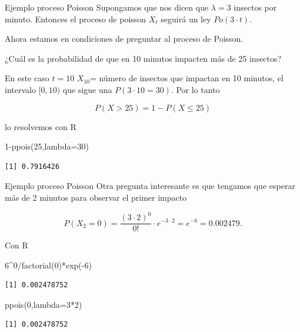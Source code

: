 \documentclass[
  ignorenonframetext,
  aspectratio=169]{beamer}
\newenvironment{Shaded}{\begin{snugshade}}{\end{snugshade}}
\newcommand{\AttributeTok}[1]{\textcolor[rgb]{0.40,0.45,0.13}{#1}}
\newcommand{\DecValTok}[1]{\textcolor[rgb]{0.68,0.00,0.00}{#1}}
\newcommand{\FunctionTok}[1]{\textcolor[rgb]{0.28,0.35,0.67}{#1}}
\newcommand{\NormalTok}[1]{\textcolor[rgb]{0.00,0.23,0.31}{#1}}
\newcommand{\SpecialCharTok}[1]{\textcolor[rgb]{0.37,0.37,0.37}{#1}}
\begin{document}
\begin{frame}[fragile]{Ejemplo proceso Poisson}
\protect\hypertarget{ejemplo-proceso-poisson-2}{}
Supongamos que nos dicen que \(\lambda=3\) insectos por minuto. Entonces
el proceso de poisson \(X_t\) seguirá un ley \(Po(3\cdot t).\)

Ahora estamos en condiciones de preguntar al proceso de Poisson.

¿Cuál es la probabilidad de que en 10 minutos impacten más de 25
insectos?

En este caso \(t=10\) \(X_{10}\)= número de insectos que impactan en 10
minutos, el intervalo \([0,10)\) que sigue una \(P(3\cdot 10=30)\). Por
lo tanto

\[P(X>25)=1-P(X\leq 25)\]

lo resolvemos con R

\begin{Shaded}
\begin{Highlighting}[]
\DecValTok{1}\SpecialCharTok{{-}}\FunctionTok{ppois}\NormalTok{(}\DecValTok{25}\NormalTok{,}\AttributeTok{lambda=}\DecValTok{30}\NormalTok{)}
\end{Highlighting}
\end{Shaded}

\begin{verbatim}
[1] 0.7916426
\end{verbatim}
\end{frame}

\begin{frame}[fragile]{Ejemplo proceso Poisson}
\protect\hypertarget{ejemplo-proceso-poisson-3}{}
Otra pregunta interesante es que tengamos que esperar más de 2 minutos
para observar el primer impacto

\[P(X_2=0)=\frac{(3\cdot 2)^0}{0!}\cdot e^{-3\cdot 2}= e^{-6}=0.002479.\]

Con R

\begin{Shaded}
\begin{Highlighting}[]
\DecValTok{6}\SpecialCharTok{\^{}}\DecValTok{0}\SpecialCharTok{/}\FunctionTok{factorial}\NormalTok{(}\DecValTok{0}\NormalTok{)}\SpecialCharTok{*}\FunctionTok{exp}\NormalTok{(}\SpecialCharTok{{-}}\DecValTok{6}\NormalTok{)}
\end{Highlighting}
\end{Shaded}

\begin{verbatim}
[1] 0.002478752
\end{verbatim}

\begin{Shaded}
\begin{Highlighting}[]
\FunctionTok{ppois}\NormalTok{(}\DecValTok{0}\NormalTok{,}\AttributeTok{lambda=}\DecValTok{3}\SpecialCharTok{*}\DecValTok{2}\NormalTok{)}
\end{Highlighting}
\end{Shaded}

\begin{verbatim}
[1] 0.002478752
\end{verbatim}
\end{frame}
\end{document}
